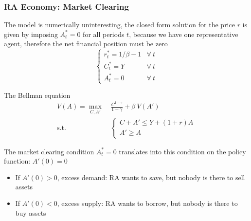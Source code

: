 \documentclass[10pt, aspectratio=1610, natbib, handout]{beamer}
\begin{document}
  \begin{frame}
    \frametitle{RA Economy: Market Clearing}

    The model is numerically uninteresting, the closed form solution for the price $r$ is given by imposing $A_t^* = 0$ for all periods $t$, because we have one representative agent, therefore the net financial position must be zero
    \begin{equation*}
      \begin{cases}
        r_t^* = 1 / \beta - 1 & \forall\ t \\
        C_t^* = Y & \forall\ t \\
        A_t^* = 0 & \forall\ t
      \end{cases}
    \end{equation*}

    \vfill\pause

    The Bellman equation
    \begin{align*}
      V(A) = \max_{C, A'} &\; \frac{C^{1-\gamma}}{1-\gamma} + \beta\ V(A') \\
      \text{s.t.} &\;
      \begin{cases}
        C + A' \leq Y + (1 + r) A \\
        A' \geq \underline{A}
      \end{cases}
    \end{align*}

    \vfill\pause

    The market clearing condition $A_t^* = 0$ translates into this condition on the policy function: $A'(0) = 0$
    \begin{itemize}
      \item If $A'(0) > 0$, excess demand: RA wants to save, but nobody is there to sell assets
      \item If $A'(0) < 0$, excess supply: RA wants to borrow, but nobody is there to buy assets
    \end{itemize}

  \end{frame}
\end{document}
